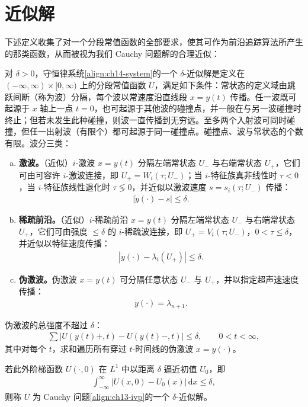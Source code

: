\documentclass[../../main.tex]{subfiles}
\begin{document}
\section{近似解}\label{section:ch14-近似解}

下述定义收集了对一个分段常值函数的全部要求，使其可作为前沿追踪算法所产生的那类函数，从而被视为我们 Cauchy 问题解的合理近似：

\begin{definition}\label{definition:ch14-近似解}
对 $\delta>0$，守恒律系统\eqref{align:ch14-system}的一个 $\delta$-近似解是定义在 $(-\infty,\infty)\times[0,\infty)$ 上的分段常值函数 $U$，满足如下条件：常状态的定义域由跳跃间断（称为波）分隔，每个波以常速度沿直线段 $x=y(t)$ 传播。任一波既可起源于 $x$ 轴上一点 $t=0$，也可起源于其他波的碰撞点，并一般在与另一波碰撞时终止；但若未发生此种碰撞，则波一直传播到无穷远。至多两个入射波可同时碰撞，但任一出射波（有限个）都可起源于同一碰撞点。碰撞点、波与常状态的个数有限。波分三类：
\begin{enumerate}[(a)]
\item \textbf{激波。}（近似）$i$-激波 $x=y(t)$ 分隔左端常状态 $U_-$ 与右端常状态 $U_+$，它们可由可容许 $i$-激波连接，即 $U_+=W_i(\tau;U_-)$；当 $i$-特征族真非线性时 $\tau<0$，当 $i$-特征族线性退化时 $\tau\lessgtr0$，并近似以激波速度 $s=s_i(\tau;U_-)$ 传播：
\begin{align}
|\dot y(\cdot)-s|\leqslant\delta.
\label{align:ch14-shock-speed}
\end{align}
\item \textbf{稀疏前沿。}（近似）$i$-稀疏前沿 $x=y(t)$ 分隔左端常状态 $U_-$ 与右端常状态 $U_+$，它们可由强度 $\leqslant\delta$ 的 $i$-稀疏波连接，即 $U_+=V_i(\tau;U_-)$，$0<\tau\leqslant\delta$，并近似以特征速度传播：
\begin{align}
|\dot y(\cdot)-\lambda_i(U_+)|\leqslant\delta.
\label{align:ch14-rarefaction-speed}
\end{align}
\item \textbf{伪激波。}伪激波 $x=y(t)$ 可分隔任意状态 $U_-$ 与 $U_+$，并以指定超声速速度传播：
\begin{align}
\dot y(\cdot)=\lambda_{n+1}.
\label{align:ch14-pseudoshock-speed}
\end{align}
\end{enumerate}
伪激波的总强度不超过 $\delta$：
\begin{align}
\sum|U(y(t)+,t)-U(y(t)-,t)|\leqslant\delta,\qquad 0<t<\infty,
\label{align:ch14-pseudoshock-strength}
\end{align}
其中对每个 $t$，求和遍历所有穿过 $t$-时间线的伪激波 $x=y(\cdot)$。

若此外阶梯函数 $U(\cdot,0)$ 在 $L^1$ 中以距离 $\delta$ 逼近初值 $U_0$，即
\begin{align}
\int_{-\infty}^{\infty}|U(x,0)-U_0(x)|\,\mathrm{d}x\leqslant\delta,
\label{align:ch14-initial-approx}
\end{align}
则称 $U$ 为 Cauchy 问题\eqref{align:ch13-ivp}的一个 $\delta$-近似解。
\end{definition}
\end{document}
